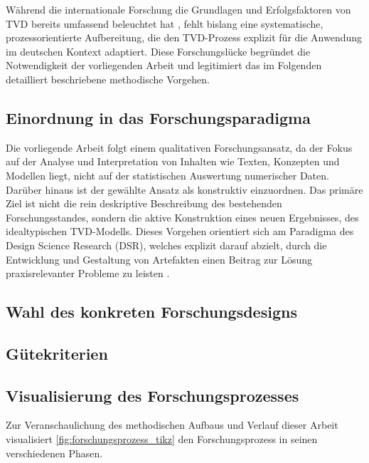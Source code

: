 Während die internationale Forschung die Grundlagen und Erfolgsfaktoren von TVD bereits umfassend beleuchtet hat \autocite{z.B. Ballard}, fehlt bislang eine systematische, prozessorientierte Aufbereitung, die den TVD-Prozess explizit für die Anwendung im deutschen Kontext adaptiert. Diese Forschungslücke begründet die Notwendigkeit der vorliegenden Arbeit und legitimiert das im Folgenden detailliert beschriebene methodische Vorgehen.

\subsection{Einordnung in das Forschungsparadigma}
\label{sec: 3.1.2}

Die vorliegende Arbeit folgt einem qualitativen Forschungsansatz, da der Fokus auf der Analyse und Interpretation von Inhalten wie Texten, Konzepten und Modellen liegt, nicht auf der statistischen Auswertung numerischer Daten. Darüber hinaus ist der gewählte Ansatz als konstruktiv einzuordnen. Das primäre Ziel ist nicht die rein deskriptive Beschreibung des bestehenden Forschungsstandes, sondern die aktive Konstruktion eines neuen Ergebnisses, des idealtypischen TVD-Modells. Dieses Vorgehen orientiert sich am Paradigma des Design Science Research (DSR), welches explizit darauf abzielt, durch die Entwicklung und Gestaltung von Artefakten einen Beitrag zur Lösung praxisrelevanter Probleme zu leisten \autocite[Vgl.][S.4]{benner-wickner_leitfaden_2020}.



\subsection{Wahl des konkreten Forschungsdesigns}
\label{sec: 3.1.3}

  \subsection{Gütekriterien}
\label{sec: 3.1.4}

\subsection{Visualisierung des Forschungsprozesses}
\label{sec: 3.1.5}
Zur Veranschaulichung des methodischen Aufbaus und Verlauf dieser Arbeit visualisiert \cref{fig:forschungsprozess_tikz} den Forschungsprozess in seinen verschiedenen Phasen.


